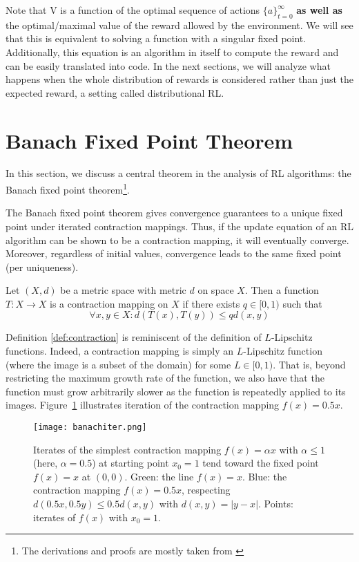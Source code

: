 \documentclass{article}
\begin{document}
Note that V is a function of the optimal sequence of actions $\{a\}_{t=0}^{\infty}$ \textbf{as well as} the optimal/maximal value of the reward allowed by the environment. We will see that this is equivalent to solving a function with a singular fixed point. Additionally, this equation is an algorithm in itself to compute the reward and can be easily translated into code. 
\newline
\newline
In the next sections, we will analyze what happens when the whole distribution of rewards is considered rather than just the expected reward, a setting called distributional RL.


\section{Banach Fixed Point Theorem}
In this section, we discuss a central theorem in the analysis of RL algorithms: the Banach fixed point theorem\footnote{The derivations and proofs are mostly taken from \citet{wikipedia}}.

The Banach fixed point theorem gives convergence guarantees to a unique fixed point under iterated contraction mappings. Thus, if the update equation of an RL algorithm can be shown to be a contraction mapping, it will eventually converge. Moreover, regardless of initial values, convergence leads to the same fixed point (per uniqueness).

\begin{defn} \label{def:contraction}
Let $(X, d)$ be a metric space with metric $d$ on space $X$. Then a function $T : X \to X$ is a contraction mapping on $X$ if there exists $q\in [0, 1)$ such that
\begin{equation*}
    \forall x, y\in X : d(T(x), T(y)) \leq qd(x, y)
\end{equation*}
\end{defn}

Definition \ref{def:contraction} is reminiscent of the definition of $L$-Lipschitz functions. Indeed, a contraction mapping is simply an $L$-Lipschitz function (where the image is a subset of the domain) for some $L \in [0, 1)$. That is, beyond restricting the maximum growth rate of the function, we also have that the function must grow arbitrarily slower as the function is repeatedly applied to its images. Figure~\ref{fig:contract} illustrates iteration of the contraction mapping $f(x) = 0.5x$.

\begin{figure}
    \centering
    \texttt{[image: banachiter.png]}
    \caption{Iterates of the simplest contraction mapping $f(x) = \alpha x$ with $\alpha \leq 1$ (here, $\alpha = 0.5$) at starting point $x_0 = 1$ tend toward the fixed point $f(x) = x$ at $(0, 0)$. Green: the line $f(x) = x$. Blue: the contraction mapping $f(x) = 0.5x$, respecting $d(0.5x, 0.5y) \leq 0.5d(x, y)$ with $d(x, y) = |y - x|$. Points: iterates of $f(x)$ with $x_0 = 1$.}
    \label{fig:contract}
\end{figure}
\end{document}
